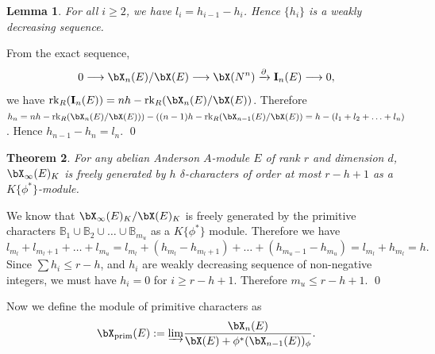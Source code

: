 \documentclass{amsart}
\def \d{\delta}
\newtheorem {theorem} {\bf{Theorem}}[section]
\newtheorem {lemma}[theorem] {\bf Lemma}
\numberwithin {equation}{section}
\def \d{\delta} \def \bZ{{\mathbb Z}} \def \bV{{\mathcal V}} \def \bF{{\bf F}}
\begin{document}
\begin{lemma}\label{upper_splitting} For all $i\geq 2$, we have  $l_{i}=h_{i-1}-h_{i}$. Hence $\{h_{i}\}$ is a weakly decreasing sequence.
\end{lemma}
\proof From the exact sequence,  $$0 \longrightarrow {\bX}_{n}(E)/\bX(E)\longrightarrow {\bX}(N^{n})\xrightarrow{\partial} \mathbf{I}_{n}(E) \longrightarrow 0 ,$$
we have $\mathrm{rk}_R (\mathbf{I}_{n}(E)) = nh- \mathrm{rk}_R ({\bX}_{n}(E)/\bX(E))$. Therefore $h_{n}= nh- \mathrm{rk}_R ({\bX}_{n}(E)/\bX(E)))- ((n-1)h- \mathrm{rk}_R ({\bX}_{n-1}(E)/\bX(E))= h-(l_{1}+l_{2}+\ldots +l_{n})$. Hence $ h_{n-1} - h_{n}= l_{n}$.
\qed

\begin{theorem}\label{fg_X_inf_K}
For any abelian Anderson $A$-module $E$ of rank $r$ and dimension $d$, ${\bX}_{\infty}(E)_{K}$  is  freely generated  
by $h$ $\d$-characters of order at most $r-h+1$ as a 
$K\{\phi^*\}$-module.
\end{theorem}

\proof We know that ${\bX}_{\infty}(E)_{K}/\bX(E)_{K}$ is freely generated by the primitive characters $\mathbb{B}_{1}\cup \mathbb{B}_{2}\cup \ldots \cup \mathbb{B}_{m_{u}}$ as a $K\{\phi^{*}\}$ module. Therefore we have $$l_{m_{l}}+l_{m_{l}+1}+\ldots +l_{m_{u}} = l_{m_{l}}+(h_{m_{l}} - h_{m_{l}+1})+ \ldots + (h_{m_{u}-1} - h_{m_{u}})=l_{{m_{l}}}+h_{{m_{l}}} = h.$$ 
Since $\sum h_{i} \leq r-h $, and $h_{i}$ are weakly decreasing sequence of non-negative integers, we must have $h_{i}=0$ for $i\geq r-h+1$. Therefore $m_{u}\leq r-h+1$. \qed \medskip

Now we define the module of primitive characters as $${\bX}_{\mathrm{prim}}(E):=\underrightarrow{\lim} \dfrac{{\bX}_{n}(E)}{\bX(E)+\phi^{*}({\bX}_{n-1}(E))_{\phi}}.$$ 
\end{document}
